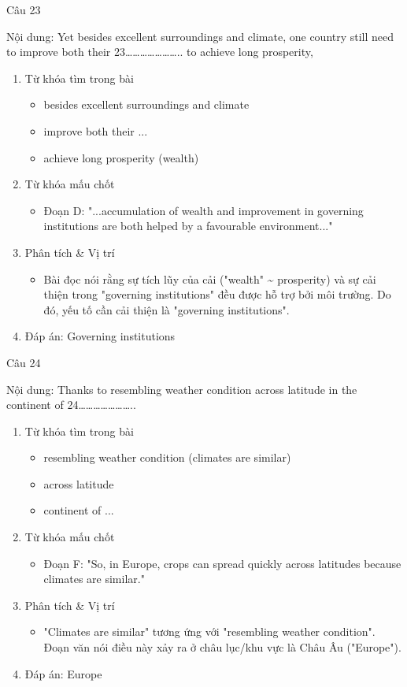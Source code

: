 \documentclass{../templateReading/cdreading}
\begin{document}
Câu 23

Nội dung: Yet besides excellent surroundings and climate, one country still need to improve both their 23………………….. to achieve long prosperity,
\begin{enumerate}
\item Từ khóa tìm trong bài
\begin{itemize}
\item besides excellent surroundings and climate
\item improve both their ...
\item achieve long prosperity (wealth)
\end{itemize}
\item Từ khóa mấu chốt
\begin{itemize}
\item Đoạn D: "...accumulation of wealth and improvement in governing institutions are both helped by a favourable environment..."
\end{itemize}
\item Phân tích \& Vị trí
\begin{itemize}
\item Bài đọc nói rằng sự tích lũy của cải ("wealth" \~{} prosperity) và sự cải thiện trong "governing institutions" đều được hỗ trợ bởi môi trường. Do đó, yếu tố cần cải thiện là "governing institutions".
\end{itemize}
\item Đáp án: Governing institutions
\end{enumerate}

Câu 24

Nội dung: Thanks to resembling weather condition across latitude in the continent of 24…………………..
\begin{enumerate}
\item Từ khóa tìm trong bài
\begin{itemize}
\item resembling weather condition (climates are similar)
\item across latitude
\item continent of ...
\end{itemize}
\item Từ khóa mấu chốt
\begin{itemize}
\item Đoạn F: "So, in Europe, crops can spread quickly across latitudes because climates are similar."
\end{itemize}
\item Phân tích \& Vị trí
\begin{itemize}
\item "Climates are similar" tương ứng với "resembling weather condition". Đoạn văn nói điều này xảy ra ở châu lục/khu vực là Châu Âu ("Europe").
\end{itemize}
\item Đáp án: Europe
\end{enumerate}
\end{document}
